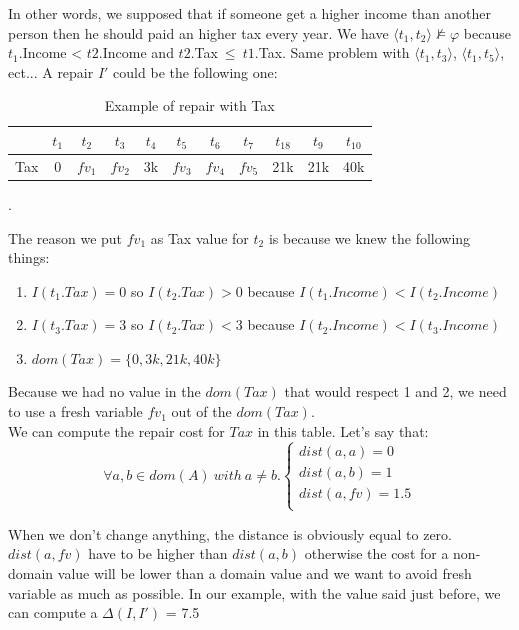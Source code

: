 \documentclass[letterpaper, 12pt]{report}
\begin{document}
In other words, we supposed that if someone get a higher income than another person then he should paid an higher tax every year. We have $ \langle t_1,t_2 \rangle \not\models \varphi $ because $t_1$.Income < $t2.$Income and $t2$.Tax$\ \leq\ t1$.Tax. Same problem with $ \langle t_1,t_3 \rangle$, $ \langle t_1,t_5 \rangle$, ect... A repair $I'$ could be the following one:

\begin{table}[H]
	\centering
	\begin{tabular}{|c|c c c c c c c c c c|}
	\hline
	   & $t_1$ & $t_2$ & $t_3$ &$t_4$ &$t_5$ &$t_6$ &$t_7$ &$t_18$ &$t_9$ &$t_10$ \\
	\hline
	 Tax & 0 & $fv_1$ & $fv_2$& 3k & $fv_3$& $fv_4$& $fv_5$& 21k & 21k & 40k\\
	 \hline
	\end{tabular}
	\caption{\label{tableExample} Example of repair with Tax}.
\end{table}

The reason we put $fv_1$ as Tax value for $t_2$ is because we knew the following things:
\begin{enumerate}

\item $I(t_1.Tax)=0$ so $I(t_2.Tax)>0$ because $I(t_1.Income)<I(t_2.Income)$
\item $I(t_3.Tax)=3$ so $I(t_2.Tax)<3$ because $I(t_2.Income)<I(t_3.Income)$
\item $dom(Tax) = \{0,3k,21k,40k\}$

\end{enumerate}
Because we had no value in the $dom(Tax)$ that would respect 1 and 2, we need to use a fresh variable $fv_1$ out of the $dom(Tax)$.\\

We can compute the repair cost for $Tax$ in this table. Let's say that:\\

$$
\forall a,b \in dom(A) \ with \ a \neq b.
\left\{
	\begin{array}{ll}
	   dist(a,a)=0\\
	   dist(a,b)=1\\
	   dist(a,fv)=1.5\\
	\end{array}
\right.
$$

When we don't change anything, the distance is obviously equal to zero. $dist(a,fv)$ have to be higher than $dist(a,b)$ otherwise the cost for a non-domain value will be lower than a domain value and we want to avoid fresh variable as much as possible. In our example, with the value said just before, we can compute a $\Delta(I,I')$ = 7.5
\end{document}
